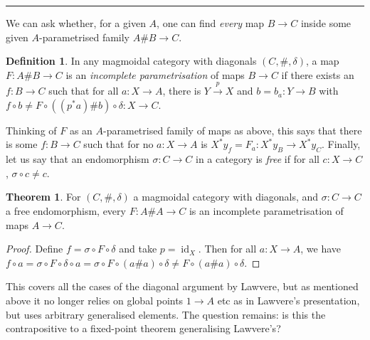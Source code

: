 \documentclass{tufte-handout}
\theoremstyle{definition}
\newtheorem*{definition}{Definition}
\newtheorem*{theorem}{Theorem}
\DeclareMathOperator{\id}{id}
\begin{document}
\hrule

\medskip

We can ask whether, for a given $A$, one can find \emph{every} map $B\to C$ inside some given $A$-parametrised family $A\# B \to C$.

\begin{definition}
In any magmoidal category with diagonals $(C,\#,\delta)$, a map $F\colon A\#B\to C$ is an \emph{incomplete parametrisation} of maps $B\to C$ if there exists an $f\colon B\to C$ such that for all $a\colon X\to A$, there is $Y\xrightarrow{p}X$ and $b = b_a\colon Y\to B$ with $f\circ b \not= F\circ((p^*a)\# b)\circ \delta\colon X\to C$.
\end{definition}

\noindent
Thinking of $F$ as an $A$-parametrised family of maps as above, this says that there is some $f\colon B\to C$ such that for no $a\colon X\to A$ is $X^*y_f = F_a\colon X^*y_B\to X^*y_C$.
Finally, let us say that an endomorphism $\sigma\colon C\to C$ in a category is \emph{free} if for all $c\colon X\to C$, $\sigma\circ c \not=c$.

\begin{theorem}
  For $(C,\#,\delta)$ a magmoidal category with diagonals, and $\sigma \colon C\to C$ a free endomorphism, every $F\colon A\# A \to C$ is an incomplete parametrisation of maps $A\to C$.
\end{theorem}

\begin{proof}
  Define $f = \sigma\circ F\circ \delta$ and take $p=\id_X$. 
  Then for all $a\colon X\to A$, we have $f\circ a = \sigma \circ F\circ \delta \circ a= \sigma \circ F \circ (a\#a)\circ \delta \not=F\circ (a\#a)\circ \delta$.
\end{proof}

\noindent
This covers all the cases of the diagonal argument by Lawvere, but as mentioned above it no longer relies on global points $1\to A$ etc as in Lawvere's presentation, but uses arbitrary generalised elements. The question remains: is this the contrapositive to a fixed-point theorem generalising Lawvere's?
\end{document}
